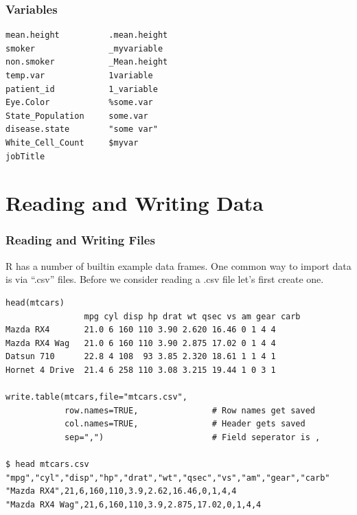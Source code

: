 \documentclass{beamer}
\begin{document}
% 

\begin{frame}[fragile]
\frametitle{Variables }

\begin{verbatim}
mean.height          .mean.height
smoker               _myvariable
non.smoker           _Mean.height
temp.var             1variable
patient_id           1_variable
Eye.Color            %some.var
State_Population     some.var
disease.state        "some var"
White_Cell_Count     $myvar
jobTitle             
\end{verbatim}

\footnotesize
\end{frame}


\section{Reading and Writing Data}
\begin{frame}[fragile]
\frametitle{Reading and Writing Files }
R has a number of builtin example data frames. One common way to import data is via ``.csv'' files. Before we consider reading a .csv file let's first create one.
\footnotesize
\begin{verbatim}
head(mtcars)
                mpg cyl disp hp drat wt qsec vs am gear carb
Mazda RX4       21.0 6 160 110 3.90 2.620 16.46 0 1 4 4
Mazda RX4 Wag   21.0 6 160 110 3.90 2.875 17.02 0 1 4 4
Datsun 710      22.8 4 108  93 3.85 2.320 18.61 1 1 4 1
Hornet 4 Drive  21.4 6 258 110 3.08 3.215 19.44 1 0 3 1

write.table(mtcars,file="mtcars.csv",
            row.names=TRUE,               # Row names get saved
            col.names=TRUE,               # Header gets saved
            sep=",")                      # Field seperator is ,

$ head mtcars.csv
"mpg","cyl","disp","hp","drat","wt","qsec","vs","am","gear","carb"
"Mazda RX4",21,6,160,110,3.9,2.62,16.46,0,1,4,4
"Mazda RX4 Wag",21,6,160,110,3.9,2.875,17.02,0,1,4,4  
\end{verbatim}

\footnotesize

\end{frame}

%
\end{document}
